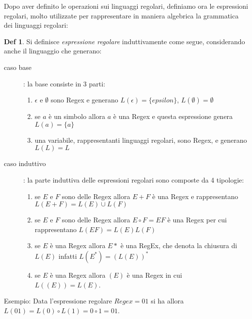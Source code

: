 \documentclass[a4paper]{book}
\theoremstyle{definition}%
\newtheorem*{defi}{Def}%
\begin{document}
Dopo aver definito le operazioni sui linguaggi regolari, definiamo ora le espressioni regolari, molto utilizzate per rappresentare in
maniera algebrica la grammatica dei linguaggi regolari:
\begin{defi}
Si definisce \emph{espressione regolare} induttivamente come segue, considerando anche il linguaggio che generano:
   \begin{description}
   \item [caso base]: la base consiste in 3 parti:
        \begin{enumerate}
        \item $\epsilon$ e $\emptyset$ sono Regex e generano $L(\epsilon) = \{epsilon\}$, $L(\emptyset) = \emptyset$
        \item se $a$ è un simbolo allora $a$ è una Regex e questa espressione genera $L(a) = \{a\}$
        \item una variabile, rappresentanti linguaggi regolari, sono Regex, e generano $L(L) = L$
        \end{enumerate}

   \item [caso induttivo]: la parte induttiva delle espressioni regolari sono composte da 4 tipologie:
        \begin{enumerate}
        \item se $E$ e $F$ sono delle Regex allora $E + F$ è una Regex e rappresentano $L(E + F) = L(E) \cup L(F)$
        \item se $E$ e $F$ sono delle Regex allora $E \circ F = EF$ è una Regex per cui rappresentano $L(EF) = L(E)L(F)$
        \item se $E$ è una Regex allora $E*$ è una RegEx, che denota la chiusura di $L(E)$ infatti $L(E^*) = (L(E))^*$
        \item se $E$ è una Regex allora $(E)$ è una Regex in cui $L((E)) = L(E)$.
        \end{enumerate}
  \end{description}
\end{defi}

Esempio: Data l'espressione regolare $Regex = 01$ si ha allora $L(01) = L(0) \circ L(1) = 0 \circ 1 = 01$.
\end{document}
